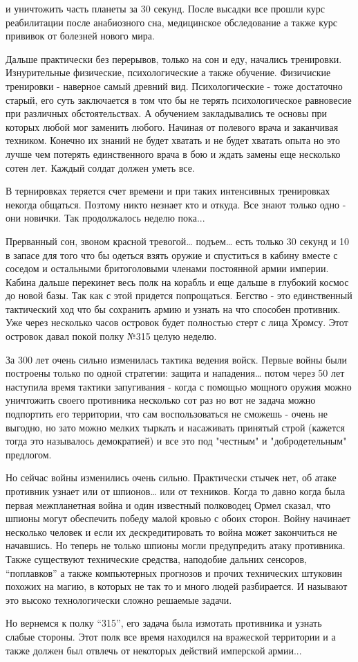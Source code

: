 и уничтожить часть планеты за 30 секунд. После высадки все прошли курс реабилитации
после анабиозного сна, медицинское обследование а также курс прививок от болезней нового мира.
\par
Дальше практически без перерывов, только на сон и еду, начались тренировки.
Изнурительные физические, психологические а также обучение. 
Физичиские тренировки - наверное самый древний вид. Психологические - тоже достаточно старый,
его суть заключается в том что бы не терять психологическое равновесие
при различных обстоятельствах. А обучением закладывались те основы
при которых любой мог заменить любого. Начиная от полевого врача и заканчивая 
техником. Конечно их знаний не будет хватать и не будет хватать опыта но это лучше
чем потерять единственного врача в бою и ждать замены еще несколько сотен лет.
Каждый солдат должен уметь все.
\par
В тернировках теряется счет времени и при таких интенсивных тренировках некогда общаться.
Поэтому никто незнает кто и откуда. Все знают только одно - они новички.
Так продолжалось неделю пока...
\par
Прерванный сон, звоном красной тревогой… подъем… есть только 30 секунд и
10 в запасе для того что бы одеться взять оружие и спуститься в кабину
вместе с соседом и остальными бритоголовыми членами постоянной армии империи.
Кабина дальше перекинет весь полк на корабль и еще дальше в глубокий
космос до новой базы. Так как с этой придется попрощаться. Бегство - это
единственный тактический ход что бы сохранить армию и узнать на что
способен противник. Уже через несколько часов островок будет полностью
стерт с лица Хромсу. Этот островок давал покой полку №315 целую неделю.
\par
За 300 лет очень сильно изменилась тактика ведения войск. Первые войны
были построены только по одной стратегии: защита и нападения… потом через
50 лет наступила время тактики запугивания - когда с помощью мощного оружия
можно уничтожить своего противника несколько сот раз но вот не задача
можно подпортить его территории, что сам воспользоваться не сможешь -
очень не выгодно, но зато можно мелких тыркать и насаживать принятый строй 
(кажется тогда это называлось демократией) и все это под "честным"
и "добродетельным" предлогом.
\par
Но сейчас войны изменились очень сильно. Практически стычек нет, об
атаке противник узнает или от шпионов… или от техников. Когда то давно
когда была первая межпланетная война и один известный полководец Ормел
сказал, что шпионы могут обеспечить победу малой кровью с обоих сторон.
Войну начинает несколько человек и если их
дескредитировать то война может закончиться не начавшись.
Но теперь не только шпионы могли предупредить атаку противника.
Также существуют технические средства, наподобие дальних сенсоров,
“поплавков” а также  компьютерных прогнозов и прочих технических
штуковин похожих на магию, в которых не так то и много людей разбирается.
И называют это высоко технологически сложно решаемые задачи.
\par
Но вернемся к полку “315”, его задача была измотать противника и узнать
слабые стороны. Этот полк все время находился на вражеской территории
и а также должен был отвлечь от некоторых действий имперской армии...
\par
